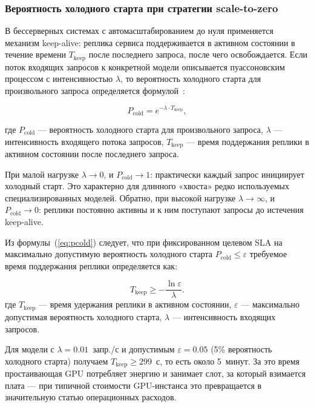 \subsubsection{Вероятность холодного старта при стратегии scale-to-zero}

В бессерверных системах с автомасштабированием до нуля применяется механизм keep-alive: реплика сервиса поддерживается в активном состоянии в течение времени $T_{\mathrm{keep}}$ после последнего запроса, после чего освобождается. Если поток входящих запросов к конкретной модели описывается пуассоновским процессом с интенсивностью $\lambda$, то вероятность холодного старта для произвольного запроса определяется формулой~\cite{little1961}:

\begin{equation}
P_{\mathrm{cold}} = e^{-\lambda \cdot T_{\mathrm{keep}}},
\label{eq:pcold}
\end{equation}

где $P_{\mathrm{cold}}$ --- вероятность холодного старта для произвольного запроса, $\lambda$ --- интенсивность входящего потока запросов, $T_{\mathrm{keep}}$ --- время поддержания реплики в активном состоянии после последнего запроса.

При малой нагрузке $\lambda \to 0$, и $P_{\mathrm{cold}} \to 1$: практически каждый запрос инициирует холодный старт. Это характерно для длинного «хвоста» редко используемых специализированных моделей. Обратно, при высокой нагрузке $\lambda \to \infty$, и $P_{\mathrm{cold}} \to 0$: реплики постоянно активны и к ним поступают запросы до истечения keep-alive.

Из формулы~(\ref{eq:pcold}) следует, что при фиксированном целевом SLA на максимально допустимую вероятность холодного старта $P_{\mathrm{cold}} \leq \varepsilon$ требуемое время поддержания реплики определяется как:

\begin{equation}
T_{\mathrm{keep}} \geq -\frac{\ln \varepsilon}{\lambda}.
\label{eq:keep_alive}
\end{equation}
где $T_{\mathrm{keep}}$ --- время удержания реплики в активном состоянии, $\varepsilon$ --- максимально допустимая вероятность холодного старта, $\lambda$ --- интенсивность входящих запросов.

Для модели с $\lambda = 0.01$~запр./с и допустимым $\varepsilon = 0.05$ (5\% вероятность холодного старта) получаем $T_{\mathrm{keep}} \geq 299$~с, то есть около 5~минут. За это время простаивающая GPU потребляет энергию и занимает слот, за который взимается плата --- при типичной стоимости GPU-инстанса это превращается в значительную статью операционных расходов.

